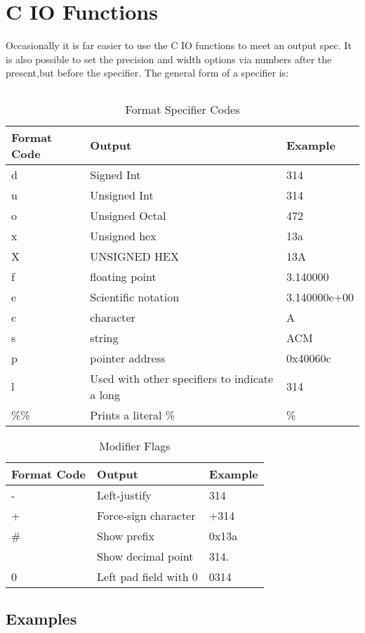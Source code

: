 \section{C IO Functions}
Occasionally it is far easier to use the C IO functions to meet an output spec. It is also possible to set the precision and width options via numbers after the present,but before the specifier.  The general form of a specifier is: 

\begin{lstlisting}[label=format code format,caption=Format Codes for printf()]
%[flags][width][.precision][length]specifier
\end{lstlisting}

\begin{table}[h]
	\caption{Format Specifier Codes\cite{cplusplus}}
	\begin{tabularx}{\textwidth}{|l|X|l|} \hline
		Format Code &   Output              &   Example     \\ \hline
		d           &   Signed Int          &   314         \\
		u           &   Unsigned Int        &   314         \\
		o           &   Unsigned Octal      &   472         \\
		x           &   Unsigned hex        &   13a         \\
		X           &   UNSIGNED HEX        &   13A         \\
		f           &   floating point      &   3.140000    \\
		e           &   Scientific notation &   3.140000e+00\\
		c           &   character           &   A           \\
		s           &   string              &   ACM         \\
		p           &   pointer address     &   0x40060c    \\
		l           &   Used with other specifiers to indicate a long & 314 \\
		\%\%        &   Prints a literal \% &   \%          \\
		\hline
	\end{tabularx}
\end{table}

\begin{table}[h]
	\caption{Modifier Flags \cite{cplusplus}}
	\begin{tabularx}{\textwidth}{|l|X|l|} \hline
		Format Code &   Output                  &   Example    \\ \hline
		-           &   Left-justify            &   314        \\
		+           &   Force-sign character    &   +314       \\
		\#          &   Show prefix             &   0x13a      \\
			  &   Show decimal point      &   314.       \\
		0           &   Left pad field with 0   &   0314       \\
		\hline
	\end{tabularx}
\end{table}

\subsection{Examples}
